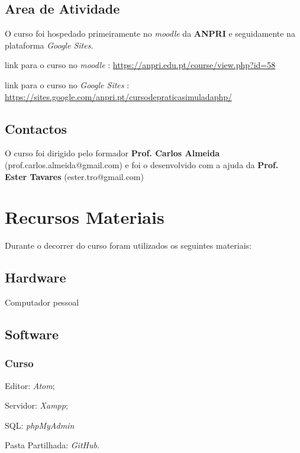 \documentclass[14pt]{article}
\begin{document}
\subsection{Area de Atividade}
O curso foi hospedado primeiramente no \textit{moodle} da \textbf{ANPRI} e seguidamente na plataforma \textit{Google Sites}.

link para o curso no \textit{moodle} : \url{https://anpri.edu.pt/course/view.php?id=58}

link para o curso no \textit{Google Sites} : \url{https://sites.google.com/anpri.pt/cursodepraticasimuladaphp/}

\subsection{Contactos}
O curso foi dirigido pelo formador \textbf{Prof. Carlos Almeida} (prof.carlos.almeida@gmail.com) e foi o desenvolvido com a ajuda da \textbf{Prof. Ester Tavares} (ester.tro@gmail.com)

\section{Recursos Materiais}
Durante o decorrer do curso foram utilizados os seguintes materiais:

\subsection{Hardware}
\begin{list}{•}
\item Computador pessoal
\end{list}

\subsection{Software}

\subsubsection{Curso}
\begin{list}{•}
\item Editor: \textit{Atom};
\item
\item Servidor: \textit{Xampp};
\item SQL: \textit{phpMyAdmin}
\item Pasta Partilhada: \textit{GitHub}.
\end{list}
\end{document}
